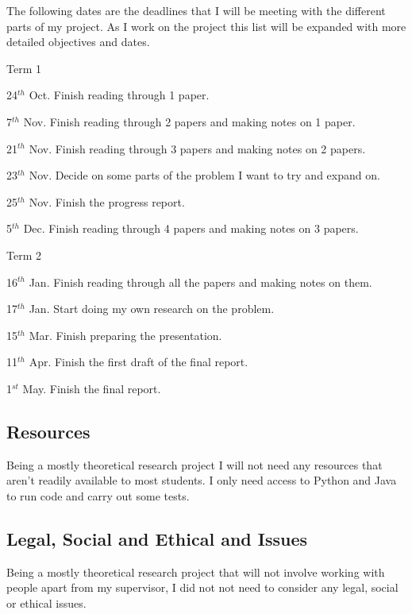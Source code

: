 \documentclass{article}
\begin{document}
The following dates are the deadlines that I will be meeting with the different parts of my project. As I work on the project this list will be expanded with more detailed objectives and dates.

\begin{flushleft}
    Term 1
    \newline
    
    24$^{th}$ Oct. Finish reading through 1 paper.
    
    7$^{th}$ Nov. Finish reading through 2 papers and making notes on 1 paper.
    
    21$^{th}$ Nov. Finish reading through 3 papers and making notes on 2 papers.
    
    23$^{th}$ Nov. Decide on some parts of the problem I want to try and expand on.
    
    25$^{th}$ Nov. Finish the progress report.
    
    5$^{th}$ Dec. Finish reading through 4 papers and making notes on 3 papers.
    \newline
    
    Term 2
    \newline
    
    16$^{th}$ Jan. Finish reading through all the papers and making notes on them.
    
    17$^{th}$ Jan. Start doing my own research on the problem.
    
    15$^{th}$ Mar. Finish preparing the presentation.
    
    11$^{th}$ Apr. Finish the first draft of the final report.
    
    1$^{st}$ May. Finish the final report.
\end{flushleft}

\subsection{Resources}

Being a mostly theoretical research project I will not need any resources that aren't readily available to most students. I only need access to Python and Java to run code and carry out some tests.

\subsection{Legal, Social and Ethical and Issues}

Being a mostly theoretical research project that will not involve working with people apart from my supervisor, I did not not need to consider any legal, social or ethical issues.

\newpage



\end{document}
